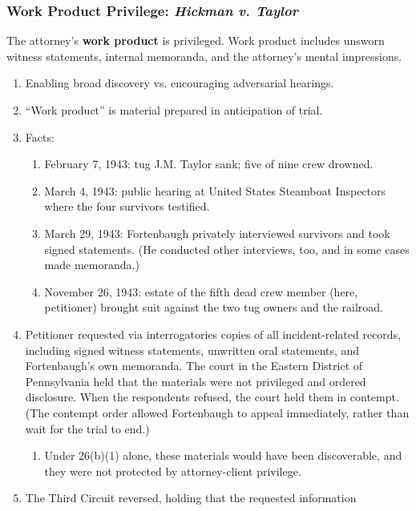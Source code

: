 \subsubsection{Work Product Privilege: \emph{Hickman v. Taylor}}

The attorney's \textbf{work product} is privileged. Work product includes 
unsworn witness statements, internal memoranda, and the attorney's mental 
impressions.

\begin{enumerate}
    \item Enabling broad discovery vs. encouraging adversarial hearings.
    \item ``Work product'' is material prepared in anticipation of trial.
    \item Facts:
    \begin{enumerate}
        \item February 7, 1943: tug J.M. Taylor sank; five of nine crew 
        drowned.
        \item March 4, 1943: public hearing at United States Steamboat 
        Inspectors where the four survivors testified.
        \item March 29, 1943: Fortenbaugh privately interviewed survivors and 
        took signed statements. (He conducted other interviews, too, and in 
        some cases made memoranda.)
        \item November 26, 1943: estate of the fifth dead crew member (here, 
        petitioner) brought suit against the two tug owners and the railroad.
    \end{enumerate}
    \item Petitioner requested via interrogatories copies of all 
    incident-related records, including signed witness statements, unwritten 
    oral statements, and Fortenbaugh's own memoranda. The court in the Eastern 
    District of Pennsylvania held that the materials were not privileged and 
    ordered disclosure. When the respondents refused, the court held them in 
    contempt. (The contempt order allowed Fortenbaugh to appeal immediately, 
    rather than wait for the trial to end.)
    \begin{enumerate}
        \item Under 26(b)(1) alone, these materials would have been 
        discoverable, and they were not protected by attorney-client 
        privilege.
    \end{enumerate}
    \item The Third Circuit reversed, holding that the requested information 

\end{enumerate}
